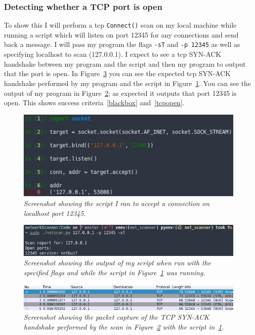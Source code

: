 \documentclass[titlepage]{article}
\let\Oldsubsubsection\subsubsection{}
\renewcommand{\subsubsection}{\FloatBarrier\Oldsubsubsection}
\begin{document}
\subsubsection{Detecting whether a TCP port is open}\label{test:tcpopen}
To show this I will perform a \gls{tcp} \verb|Connect()| scan on my local
machine while running a script which will listen on port 12345 for any connections
and send back a message. I will pass my program the flags \verb|-sT| and
\verb|-p 12345| as well as specifying localhost to scan (127.0.0.1).
I expect to see a \gls{tcp} SYN-ACK handshake between my program and the script and
then my program to output that the port is open. In Figure~\ref{tcpopenpcap} you can
see the expected \gls{tcp} SYN-ACK handshake performed by my program and the script
in Figure~\ref{tcpopenscript}.
You can see the output of my program in Figure~\ref{tcpopenoutput}; as expected
it outputs that port 12345 is open. This shows success criteria~\ref{blackbox}
and~\ref{tcpopen}.

\begin{figure}[H]
  \centering
  \includegraphics[width=\textwidth]{tcpopenscript.png}
  \caption{\textit{%
    Screenshot showing the script I ran to accept a connection on localhost port 12345.
}}\label{tcpopenscript}
\end{figure}

\begin{figure}[H]
  \centering
  \includegraphics[width=\textwidth]{tcpopenoutput.png}
  \caption{\textit{%
    Screenshot showing the output of my script when run with the specified flags
    and while the script in Figure~\ref{tcpopenscript} was running.
}}\label{tcpopenoutput}
\end{figure}

\begin{figure}[H]
  \centering
  \includegraphics[width=\textwidth]{tcpopenpcap.png}
  \caption{\textit{%
    Screenshot showing the packet capture of the TCP SYN-ACK handshake performed
    by the scan in Figure~\ref{tcpopenoutput} with the script in~\ref{tcpopenscript}.
}}\label{tcpopenpcap}
\end{figure}
\end{document}

